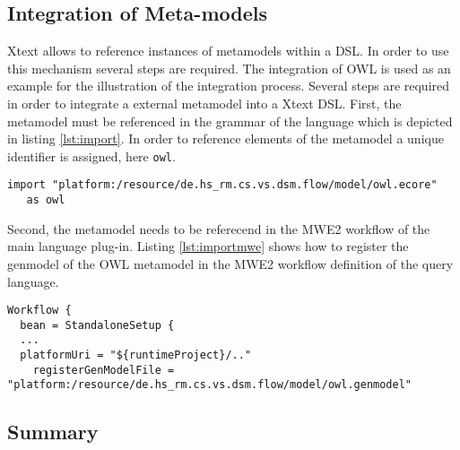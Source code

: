 \subsection{Integration of Meta-models}
Xtext allows to reference instances of metamodels within a DSL. In order to use 
this mechanism several steps are required. The integration of OWL is used as an
example for the illustration of the integration process. Several steps are 
required in order to integrate a external metamodel into a Xtext DSL. First, the
metamodel must be referenced in the grammar of the language which is depicted in
listing \ref{lst:import}. In order to reference elements of the metamodel a 
unique identifier is assigned, here \texttt{owl}.
\begin{lstlisting}[language=Xtext, caption={\emph{Integration of the OWL ecore model into a grammar}},label={lst:import}]
import "platform:/resource/de.hs_rm.cs.vs.dsm.flow/model/owl.ecore"
   as owl
\end{lstlisting}
Second, the metamodel needs to be referecend in the MWE2 workflow of the main 
language plug-in. Listing \ref{lst:importmwe} shows how to register the
genmodel of the OWL metamodel in the MWE2 workflow definition of the query 
language.
\begin{lstlisting}[language=MWE2, caption={\emph{Integration of the OWL ecore model into a MWE2 workflow}},label={lst:importmwe}]
Workflow {
  bean = StandaloneSetup {
  ...
  platformUri = "${runtimeProject}/.."
    registerGenModelFile = "platform:/resource/de.hs_rm.cs.vs.dsm.flow/model/owl.genmodel"
\end{lstlisting}

\subsection{Summary}
